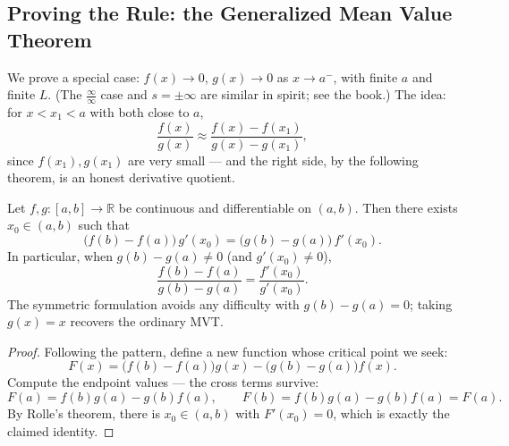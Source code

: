 \documentclass[11pt]{report}
\begin{document}
\subsection{Proving the Rule: the Generalized Mean Value Theorem}

We prove a special case: $f(x) \to 0$, $g(x) \to 0$ as $x \to a^-$, with finite $a$ and finite $L$. (The $\tfrac\infty\infty$ case and $s = \pm\infty$ are similar in spirit; see the book.) The idea: for $x < x_1 < a$ with both close to $a$,
\[
\frac{f(x)}{g(x)} \approx \frac{f(x) - f(x_1)}{g(x) - g(x_1)},
\]
since $f(x_1), g(x_1)$ are very small --- and the right side, by the following theorem, is an honest derivative quotient.

\begin{thmbox}
Let $f, g: [a,b] \to \mathbb{R}$ be continuous and differentiable on $(a,b)$. Then there exists $x_0 \in (a,b)$ such that
\[
\bigl(f(b) - f(a)\bigr)\, g'(x_0) = \bigl(g(b) - g(a)\bigr)\, f'(x_0).
\]
In particular, when $g(b) - g(a) \neq 0$ (and $g'(x_0) \neq 0$),
\[
\frac{f(b) - f(a)}{g(b) - g(a)} = \frac{f'(x_0)}{g'(x_0)}.
\]
The symmetric formulation avoids any difficulty with $g(b) - g(a) = 0$; taking $g(x) = x$ recovers the ordinary MVT.
\end{thmbox}

\begin{proof}
Following the pattern, define a new function whose critical point we seek:
\[
F(x) = \bigl(f(b) - f(a)\bigr) g(x) - \bigl(g(b) - g(a)\bigr) f(x).
\]
Compute the endpoint values --- the cross terms survive:
\[
F(a) = f(b)g(a) - g(b)f(a), \qquad F(b) = f(b)g(a) - g(b)f(a) = F(a).
\]
By Rolle's theorem, there is $x_0 \in (a,b)$ with $F'(x_0) = 0$, which is exactly the claimed identity.
\end{proof}
\end{document}
